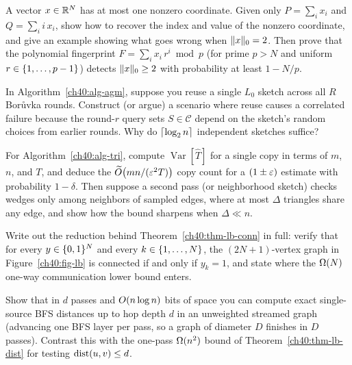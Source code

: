 \begin{exercise}
A vector $x\in\mathbb{R}^N$ has at most one nonzero coordinate. Given only
$P=\sum_i x_i$ and $Q=\sum_i i\,x_i$, show how to recover the index and value
of the nonzero coordinate, and give an example showing what goes wrong when
$\lVert x\rVert_0 = 2$. Then prove that the polynomial fingerprint
$F = \sum_i x_i\, r^i \bmod p$ (for prime $p>N$ and uniform $r\in\{1,\dots,p-1\}$)
detects $\lVert x\rVert_0 \ge 2$ with probability at least $1 - N/p$.
\end{exercise}

\begin{exercise}
In Algorithm~\ref{ch40:alg-agm}, suppose you reuse a single $L_0$ sketch
across all $R$ Bor\r{u}vka rounds. Construct (or argue) a scenario where reuse
causes a correlated failure because the round-$r$ query sets $S\in\mathcal{C}$
depend on the sketch's random choices from earlier rounds. Why do
$\lceil\log_2 n\rceil$ independent sketches suffice?
\end{exercise}

\begin{exercise}\label{ch40:ex-tri-var}
For Algorithm~\ref{ch40:alg-tri}, compute $\operatorname{Var}[\widehat T]$ for a
single copy in terms of $m$, $n$, and $T$, and deduce the $\widetilde{O}\bigl(mn/(\varepsilon^2 T)\bigr)$
copy count for a $(1\pm\varepsilon)$ estimate with probability $1-\delta$. Then suppose
a second pass (or neighborhood sketch) checks wedges only among neighbors of
sampled edges, where at most $\Delta$ triangles share any edge, and show how the
bound sharpens when $\Delta \ll n$.
\end{exercise}

\begin{exercise}
Write out the reduction behind Theorem~\ref{ch40:thm-lb-conn} in full: verify
that for every $y\in\{0,1\}^N$ and every $k\in\{1,\dots,N\}$, the
$(2N+1)$-vertex graph in Figure~\ref{ch40:fig-lb} is connected if and only if
$y_k=1$, and state where the $\Omega(N)$ one-way communication lower bound enters.
\end{exercise}

\begin{exercise}\label{ch40:ex-passes}
Show that in $d$ passes and $O(n\log n)$ bits of space you can compute exact
single-source BFS distances up to hop depth $d$ in an unweighted streamed graph
(advancing one BFS layer per pass, so a graph of diameter $D$ finishes in $D$
passes). Contrast this with the one-pass $\Omega(n^2)$ bound of
Theorem~\ref{ch40:thm-lb-dist} for testing $\operatorname{dist}(u,v)\le d$.
\end{exercise}

